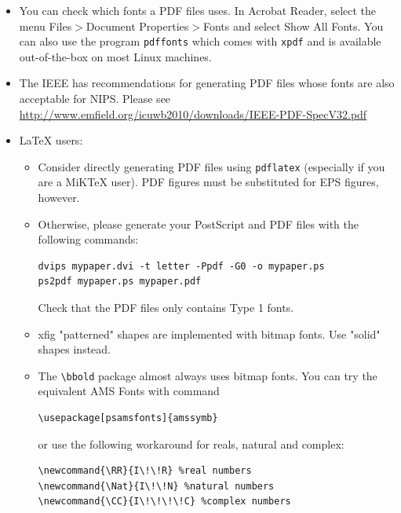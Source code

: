 \documentclass{article} %
\begin{document}
\begin{itemize}

\item You can check which fonts a PDF files uses.  In Acrobat Reader,
select the menu Files$>$Document Properties$>$Fonts and select Show All Fonts. You can
also use the program \verb+pdffonts+ which comes with \verb+xpdf+ and is
available out-of-the-box on most Linux machines.

\item The IEEE has recommendations for generating PDF files whose fonts
are also acceptable for NIPS. Please see
\url{http://www.emfield.org/icuwb2010/downloads/IEEE-PDF-SpecV32.pdf}

\item LaTeX users:

\begin{itemize}

\item Consider directly generating PDF files using \verb+pdflatex+
(especially if you are a MiKTeX user).
PDF figures must be substituted for EPS figures, however.

\item Otherwise, please generate your PostScript and PDF files with the following commands:
\begin{verbatim}
dvips mypaper.dvi -t letter -Ppdf -G0 -o mypaper.ps
ps2pdf mypaper.ps mypaper.pdf
\end{verbatim}

Check that the PDF files only contains Type 1 fonts.

\item xfig "patterned" shapes are implemented with
bitmap fonts.  Use "solid" shapes instead.
\item The \verb+\bbold+ package almost always uses bitmap
fonts.  You can try the equivalent AMS Fonts with command
\begin{verbatim}
\usepackage[psamsfonts]{amssymb}
\end{verbatim}
 or use the following workaround for reals, natural and complex:
\begin{verbatim}
\newcommand{\RR}{I\!\!R} %real numbers
\newcommand{\Nat}{I\!\!N} %natural numbers
\newcommand{\CC}{I\!\!\!\!C} %complex numbers
\end{verbatim}


\end{itemize}
\end{itemize}
\end{document}
